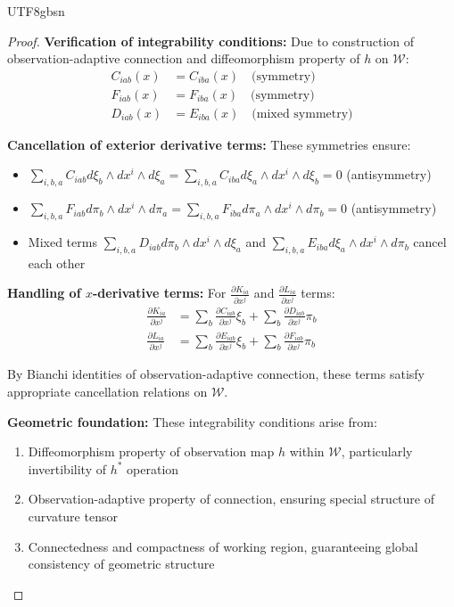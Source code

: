 \documentclass[a4paper,12pt]{extarticle}
\theoremstyle{definition}
\begin{document}
\begin{CJK}{UTF8}{gbsn}
\begin{proof}
\textbf{Verification of integrability conditions:}
Due to construction of observation-adaptive connection and diffeomorphism property of $h$ on $\mathcal{W}$:
\begin{align*}
C_{iab}(x) &= C_{iba}(x) \quad \text{(symmetry)}\\
F_{iab}(x) &= F_{iba}(x) \quad \text{(symmetry)}\\
D_{iab}(x) &= E_{iba}(x) \quad \text{(mixed symmetry)}
\end{align*}

\textbf{Cancellation of exterior derivative terms:}
These symmetries ensure:
\begin{itemize}
\item $\sum_{i,b,a} C_{iab} d\xi_b \wedge dx^i \wedge d\xi_a = \sum_{i,b,a} C_{iba} d\xi_a \wedge dx^i \wedge d\xi_b = 0$ (antisymmetry)
\item $\sum_{i,b,a} F_{iab} d\pi_b \wedge dx^i \wedge d\pi_a = \sum_{i,b,a} F_{iba} d\pi_a \wedge dx^i \wedge d\pi_b = 0$ (antisymmetry)
\item Mixed terms $\sum_{i,b,a} D_{iab} d\pi_b \wedge dx^i \wedge d\xi_a$ and $\sum_{i,b,a} E_{iba} d\xi_a \wedge dx^i \wedge d\pi_b$ cancel each other
\end{itemize}

\textbf{Handling of $x$-derivative terms:}
For $\frac{\partial K_{ia}}{\partial x^j}$ and $\frac{\partial L_{ia}}{\partial x^j}$ terms:
\begin{align*}
\frac{\partial K_{ia}}{\partial x^j} &= \sum_b \frac{\partial C_{iab}}{\partial x^j}\xi_b + \sum_b \frac{\partial D_{iab}}{\partial x^j}\pi_b\\
\frac{\partial L_{ia}}{\partial x^j} &= \sum_b \frac{\partial E_{iab}}{\partial x^j}\xi_b + \sum_b \frac{\partial F_{iab}}{\partial x^j}\pi_b
\end{align*}

By Bianchi identities of observation-adaptive connection, these terms satisfy appropriate cancellation relations on $\mathcal{W}$.

\textbf{Geometric foundation:} These integrability conditions arise from:
\begin{enumerate}
\item Diffeomorphism property of observation map $h$ within $\mathcal{W}$, particularly invertibility of $h^*$ operation
\item Observation-adaptive property of connection, ensuring special structure of curvature tensor
\item Connectedness and compactness of working region, guaranteeing global consistency of geometric structure
\end{enumerate}


\end{proof}
\end{CJK}
\end{document}
